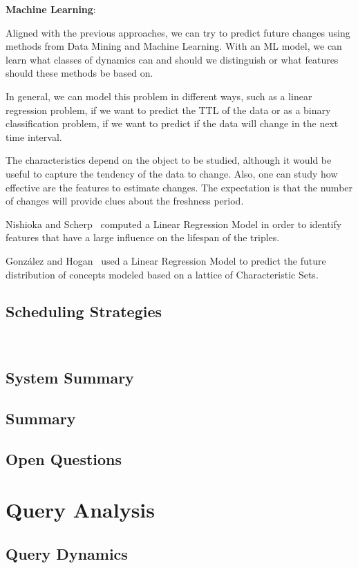 \documentclass[sw]{iosart2x}
\begin{document}
\textbf{Machine Learning}:

Aligned with the previous approaches, we can try to predict future changes using methods from Data Mining and Machine Learning. With an ML model, we can learn what classes of dynamics can and should we distinguish or what features should these methods be based on.

In general, we can model this problem in different ways, such as a linear regression problem, if we want to predict the TTL of the data or as a binary classification problem, if we want to predict if the data will change in the next time interval.

The characteristics depend on the object to be studied, although it would be useful to capture the tendency of the data to change. Also, one can study how effective are the features to estimate changes. The expectation is that the number of changes will provide clues about the freshness period.

Nishioka and Scherp~\cite{NishiokaS17} computed a Linear Regression Model in order to identify features that have a large influence on the lifespan of the triples. 

Gonz\'{a}lez and Hogan~\cite{GonzalezH18} used a Linear Regression Model to predict the future distribution of concepts modeled based on a lattice of Characteristic Sets. 

\subsection{Scheduling Strategies}\label{Scheduling}
~\cite{AkhtarAL17}

\subsection{System Summary}\label{System2}
\subsection{Summary}\label{Summary2}
\subsection{Open Questions}\label{Open2}

\section{Query Analysis}\label{Query}
\subsection{Query Dynamics}\label{Dynamics}
\end{document}
